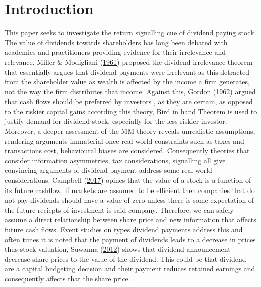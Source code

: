 \documentclass[11pt,preprint, authoryear]{elsarticle}
\numberwithin{equation}{section}
\numberwithin{figure}{section}
\numberwithin{table}{section}
\begin{document}
\setcounter{footnote}{0}



\pagestyle{fancy}
\chead{}
\rhead{}
\lfoot{}
\lhead{}
\cfoot{}


\headsep 35pt %




\hypertarget{introduction}{%
\section*{Introduction}\label{introduction}}

This paper seeks to investigate the return signalling cue of dividend
paying stock. The value of dividends towards shareholders has long been
debated with academics and practitioners providing evidence for their
irrelevance and relevance. Miller \& Modigliani
(\protect\hyperlink{ref-miller}{1961}) proposed the dividend irrelevance
theorem that essentially argues that dividend payments were irrelevant
as this detracted from the shareholder value as wealth is affected by
the income a firm generates, not the way the firm distributes that
income. Against this, Gordon (\protect\hyperlink{ref-gordon1962}{1962})
argued that cash flows should be preferred by investors , as they are
certain, as opposed to the riskier capital gains according this theory,
Bird in hand Theorem is used to justify demand for dividend stock,
especially for the less riskier investor. Moreover, a deeper assessment
of the MM theory reveals unrealistic assumptions, rendering arguments
immaterial once real world constraints such as taxes and transactions
cost, behavioural biases are considered. Consequently theories that
consider information asymmetries, tax considerations, signalling all
give convincing arguments of dividend payment address some real world
considerations. Campbell
(\protect\hyperlink{ref-campbell2017financial}{2017}) opines that the
value of a stock is a function of its future cashflow, if markets are
assumed to be efficient then companies that do not pay dividends should
have a value of zero unless there is some expectation of the future
reciepts of investment is said company. Therefore, we can safely assume
a direct relationship between share price and new information that
affects future cash flows. Event studies on types dividend payments
address this and often times it is noted that the payment of dividends
leads to a decrease in prices thus stock valuation, Suwanna
(\protect\hyperlink{ref-suwanna2012impacts}{2012}) shows that dividend
announcement decrease share prices to the value of the dividend. This
could be that dividend are a capital budgeting decision and their
payment reduces retained earnings and consequently affects that the
share price.
\end{document}
